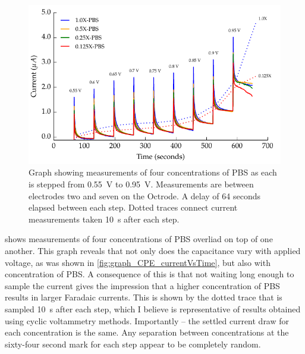        \begin{figure}
          \centering
          \includegraphics{content/pt2/08-InterfaceParameters/graphics/graph_currentTimeFaradaicCPE_Stacked_Thesis}
          \caption{\label{fig:graph_currentTimeFaradaicCPE_Stacked_Thesis}Graph showing measurements of four concentrations of PBS as each is stepped from \SI{0.55}{\volt} to \SI{0.95}{\volt}. Measurements are between electrodes two and seven on the Octrode. A delay of 64 seconds elapsed between each step. Dotted traces connect current measurements taken \SI{10}{\second} after each step.}
        \end{figure}
         shows measurements of four concentrations of PBS overliad on top of one another.
        This graph reveals that not only does the capacitance vary with applied voltage, as was shown in \cref{fig:graph_CPE_currentVsTime}, but also with concentration of PBS.
        A consequence of this is that not waiting long enough to sample the current gives the impression that a higher concentration of PBS results in larger Faradaic currents.
        This is shown by the dotted trace that is sampled \SI{10}{\second} after each step, which I believe is representative of results obtained using cyclic voltammetry methods.
        Importantly -- the settled current draw for each concentration is the same.
        Any separation between concentrations at the sixty-four second mark for each step appear to be completely random.

